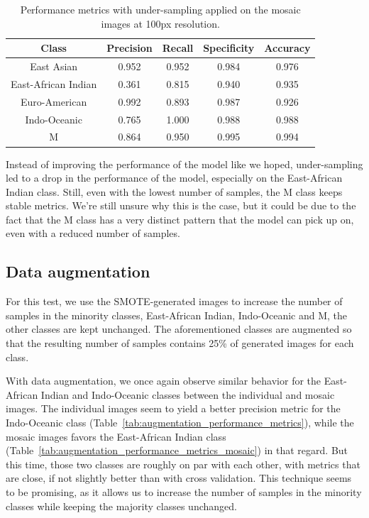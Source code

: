 \begin{table}[H]
	\centering
	\begin{tabular}{|c|c|c|c|c|}
		\hline
		\textbf{Class}      & \textbf{Precision} & \textbf{Recall} & \textbf{Specificity} & \textbf{Accuracy} \\
		\hline
		East Asian          & 0.952              & 0.952           & 0.984                & 0.976             \\
		East-African Indian & 0.361              & 0.815           & 0.940                & 0.935             \\
		Euro-American       & 0.992              & 0.893           & 0.987                & 0.926             \\
		Indo-Oceanic        & 0.765              & 1.000           & 0.988                & 0.988             \\
		M                   & 0.864              & 0.950           & 0.995                & 0.994             \\
		\hline
	\end{tabular}
	\caption{Performance metrics with under-sampling applied on the mosaic images at 100px resolution.}
	\label{tab:under_sampling_performance_metrics_mosaic}
\end{table}

Instead of improving the performance of the model like we hoped, under-sampling led to a drop in the performance of the model, especially
on the East-African Indian class. Still, even with the lowest number of samples, the M class keeps stable metrics. We're still unsure why
this is the case, but it could be due to the fact that the M class has a very distinct pattern that the model can pick up on, even with
a reduced number of samples.

\subsection{Data augmentation}
\label{subsec:data_augmentation}

For this test, we use the SMOTE-generated images to increase the number of samples in the minority classes, East-African Indian, Indo-Oceanic and M,
the other classes are kept unchanged. The aforementioned classes are augmented so that the resulting number of samples contains 25\% of generated images
for each class.

\label{subsubsec:results_data_augmentation}

With data augmentation, we once again observe similar behavior for the East-African Indian and Indo-Oceanic classes between the individual and mosaic images.
The individual images seem to yield a better precision metric for the Indo-Oceanic class (Table~\ref{tab:augmentation_performance_metrics}), while the mosaic
images favors the East-African Indian class (Table~\ref{tab:augmentation_performance_metrics_mosaic}) in that regard. But this time, those two classes are
roughly on par with each other, with metrics that are close, if not slightly better than with cross validation. This technique seems to be promising, as it
allows us to increase the number of samples in the minority classes while keeping the majority classes unchanged.

